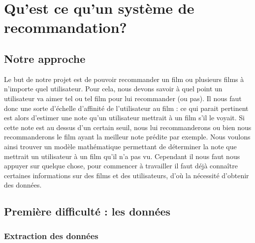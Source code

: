 \documentclass[a4paper,10pt]{article}
\title{}
\author{}
\begin{document}
\maketitle

\begin{abstract}
\end{abstract}

\section{Qu'est ce qu'un système de recommandation?}

\subsection{Notre approche}
Le but de notre projet est de pouvoir recommander un film ou plusieurs films à n'importe quel utilisateur. 
Pour cela, nous devons savoir à quel point un utilisateur va aimer tel ou tel film pour lui recommander (ou pas). 
Il nous faut donc une sorte d'échelle d'affinité de l'utilisateur au film : ce qui parait pertinent est alors d'estimer une note qu'un utilisateur mettrait à un film s'il le voyait.
Si cette note est au dessus d'un certain seuil, nous lui recommanderons ou bien nous recommanderons le film ayant la meilleur note prédite par exemple.
Nous voulons ainsi trouver un modèle mathématique permettant de déterminer la note que mettrait un utilisateur à un film qu'il n'a pas vu. 
Cependant il nous faut nous appuyer sur quelque chose, pour commencer à travailler il faut déjà connaître certaines informations sur des films et des utilisateurs, d'où la nécessité d'obtenir des données.

\subsection{Première difficulté : les données}
\subsubsection{Extraction des données}
\end{document}
